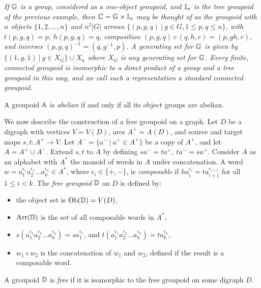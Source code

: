\begin{example} \label{ex:gp-tree-gpd}
\emph{If $\mathbb{G}$ is a group, considered as a one-object groupoid, 
and $\mathbb{I}_n$ is the tree groupoid of the previous example, then $\mathbb{C} = \mathbb{G} \times \mathbb{I}_n$ 
may be thought of as the groupoid with $n$ objects $\{1,2,\ldots,n\}$ 
and $n^2|G|$ arrows $\{(p,g,q) ~|~ g \in G, 1 \leqslant p,q \leqslant n\}$, 
with $t(p,g,q)=p$, $h(p,g,q)=q$, 
composition $(p,g,q)\diamond(q,h,r) = (p,gh,r)$, 
and inverses $(p,g,q)^{-1} = (q,g^{-1},p)$. 
A generating set for $\mathbb{G}$ is given by 
$\{(1,g,1) ~|~ g \in X_G\} \cup X_n$ 
where $X_G$ is any generating set for $\mathbb{G}$. 
Every finite, connected groupoid is isomorphic to a direct product 
of a group and a tree groupoid in this way, and we call such a 
representation a \emph{standard connected groupoid}.}
\end{example}

A groupoid $\mathbb{A}$ is \emph{abelian}   
if and only if all its object groups are abelian. 

\medskip
We now describe the construction of a free groupoid on a graph. 
Let $D$ be a digraph with vertices $V = V(D)$, arcs $A^+=A(D)$, 
and source and target maps $s,t : A^+ \to V$. 
Let $A^- = \{a^- ~|~ a^+ \in A^+\}$ be a copy of $A^+$, 
and let $A = A^+ \cup A^-$.  
Extend $s,t$ to $A$ by defining $sa^-=ta^+,~ ta^-=sa^+$. 
Consider $A$ as an alphabet with $A^*$ the monoid of words in $A$ 
under concatenation. 
A word $w=a_1^{\epsilon_1}a_2^{\epsilon_2} \ldots a_k^{\epsilon_k} \in A^*$, 
where $\epsilon_i \in \{+,-\}$, is \emph{composable} 
if $ha_i^{\epsilon_i} = ta_{i+1}^{\epsilon_{i+1}}$ 
for all $1 \leqslant i < k$. 
The \emph{free groupoid} $\mathbb{D}$ on $D$ is defined by: 
\begin{itemize} 
\item 
the object set is $\mathrm{Ob}(\mathbb{D}) = V(D)$,  
\item
$\mathrm{Arr}(\mathbb{D})$ is the set of all composable words in $A^*$, 
\item
$s(a_1^{\epsilon_1}a_2^{\epsilon_2} \ldots a_k^{\epsilon_k}) 
   = sa_1^{\epsilon_1}$, 
and $t(a_1^{\epsilon_1}a_2^{\epsilon_2} \ldots a_k^{\epsilon_k}) 
   = ta_k^{\epsilon_k}$, 
\item
$w_1 \diamond w_2$ is the concatenation of $w_1$ and $w_2$, 
defined if the result is a composable word.
\end{itemize} 
A groupoid $\mathbb{D}$ is \emph{free} if it is isomorphic to the free groupoid 
on some digraph $D$. 

